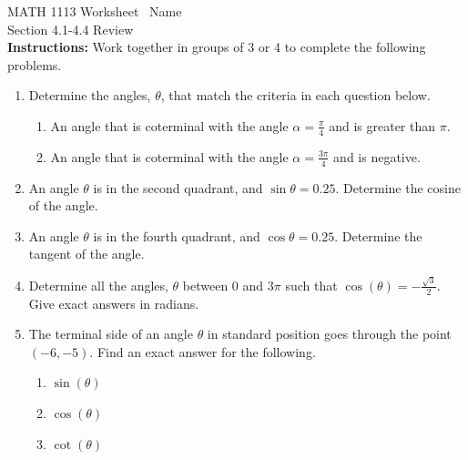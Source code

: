 \documentclass[11pt]{article}
\begin{document}
\noindent MATH 1113   \quad\quad\quad\quad\quad Worksheet \quad\quad\quad\quad\quad\   Name \underline{\phantom{alphabetsoupismyveryveryfavorite}}\\ 
\noindent Section 4.1-4.4 Review \\




\noindent \textbf{Instructions:}  Work together in groups of  3 or 4 to complete the following problems.\\


\begin{enumerate}
\item Determine the angles, $\theta$, that match the criteria in each question below.
\begin{enumerate}
\item An angle that is coterminal with the angle $\alpha=\frac{\pi}{4}$ and is greater than $\pi$.\vfill
\item An angle that is coterminal with the angle $\alpha=\frac{3\pi}{4}$ and is negative.\vfill
\end{enumerate}

\item An angle $\theta$ is in the second quadrant, and $\sin{\theta}=0.25$.  Determine the cosine of the angle.\vfill

\item An angle $\theta$ is in the fourth quadrant, and $\cos{\theta}=0.25$.  Determine the tangent of the angle.\vfill

\item Determine all the angles, $\theta$ between 0 and $3\pi$ such that $\cos{(\theta)}=-\frac{\sqrt{3}}{2}$.  Give exact answers in radians.\vfill

\newpage


\item The terminal side of an angle $\theta$ in standard position goes through the point $(-6,-5).$  Find an exact answer for the following.
\begin{enumerate}
\item $\sin{(\theta)}$\vfill
\item $\cos{(\theta)}$\vfill
\item $\cot{(\theta)}$\vfill

\end{enumerate}


\end{enumerate}
\end{document}
